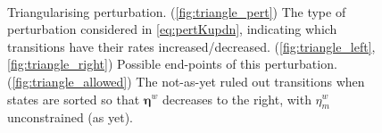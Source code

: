 \documentclass[12pt]{article}
\newcommand{\etwm}{\eta^w}
\newcommand{\etw}{\boldsymbol{\eta}^w}
\begin{document}
\begin{figure}[ht]
\begin{center}
\begin{myenuma}
  \item \label{fig:triangle_pert} 
  \item \label{fig:triangle_left} 
  \item \label{fig:triangle_right} 
  \\[1em]
  \item \label{fig:triangle_allowed} 
\end{myenuma}
\caption[Triangularising perturbation]{Triangularising perturbation.
  (\ref*{fig:triangle_pert}) The type of perturbation considered in \cref{eq:pertKupdn}, indicating which transitions have their rates increased/decreased.
  (\ref*{fig:triangle_left},\ref*{fig:triangle_right}) Possible end-points of this perturbation. 
  (\ref*{fig:triangle_allowed}) The not-as-yet ruled out transitions when states are sorted so that \(\etw\) decreases to the right, with \(\etwm_m\) unconstrained (as yet).
\label{fig:triangle_s}}
\end{center}
\end{figure}
\end{document}
